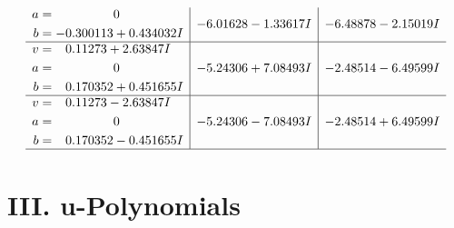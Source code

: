 \documentclass[1p]{elsarticle_modified}
\theoremstyle{definition}
\begin{document}
$$\begin{array}{c|c|c}
\begin{aligned}
a &= \phantom{-0.000000 } 0 \\
b &= -0.300113 + 0.434032 I\end{aligned}
 & -6.01628 - 1.33617 I & -6.48878 - 2.15019 I \\ \hline\begin{aligned}
v &= \phantom{-}0.11273 + 2.63847 I \\
a &= \phantom{-0.000000 } 0 \\
b &= \phantom{-}0.170352 + 0.451655 I\end{aligned}
 & -5.24306 + 7.08493 I & -2.48514 - 6.49599 I \\ \hline\begin{aligned}
v &= \phantom{-}0.11273 - 2.63847 I \\
a &= \phantom{-0.000000 } 0 \\
b &= \phantom{-}0.170352 - 0.451655 I\end{aligned}
 & -5.24306 - 7.08493 I & -2.48514 + 6.49599 I\\
 \hline 
 \end{array}$$\newpage
\newpage\renewcommand{\arraystretch}{1}
\centering \section*{ III. u-Polynomials}
\end{document}
